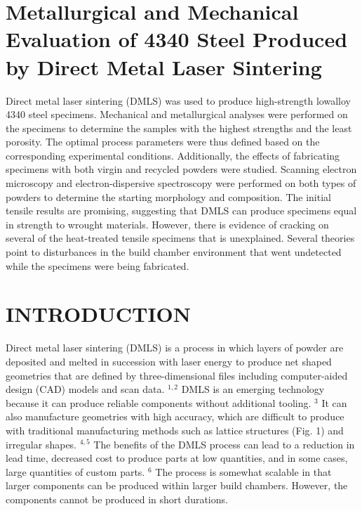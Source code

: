 \documentclass[10pt]{article}
\begin{document}
\section*{Metallurgical and Mechanical Evaluation of 4340 Steel Produced by Direct Metal Laser Sintering }
Direct metal laser sintering (DMLS) was used to produce high-strength lowalloy 4340 steel specimens. Mechanical and metallurgical analyses were performed on the specimens to determine the samples with the highest strengths and the least porosity. The optimal process parameters were thus defined based on the corresponding experimental conditions. Additionally, the effects of fabricating specimens with both virgin and recycled powders were studied. Scanning electron microscopy and electron-dispersive spectroscopy were performed on both types of powders to determine the starting morphology and composition. The initial tensile results are promising, suggesting that DMLS can produce specimens equal in strength to wrought materials. However, there is evidence of cracking on several of the heat-treated tensile specimens that is unexplained. Several theories point to disturbances in the build chamber environment that went undetected while the specimens were being fabricated.

\section*{INTRODUCTION}
Direct metal laser sintering (DMLS) is a process in which layers of powder are deposited and melted in succession with laser energy to produce net shaped geometries that are defined by three-dimensional files including computer-aided design (CAD) models and scan data. ${ }^{1,2}$ DMLS is an emerging technology because it can produce reliable components without additional tooling. ${ }^{3}$ It can also manufacture geometries with high accuracy, which are difficult to produce with traditional manufacturing methods such as lattice structures (Fig. 1) and irregular shapes. ${ }^{4,5}$ The benefits of the DMLS process can lead to a reduction in lead time, decreased cost to produce parts at low quantities, and in some cases, large quantities of custom parts. ${ }^{6}$ The process is somewhat scalable in that larger components can be produced within larger build chambers. However, the components cannot be produced in short durations.
\end{document}
